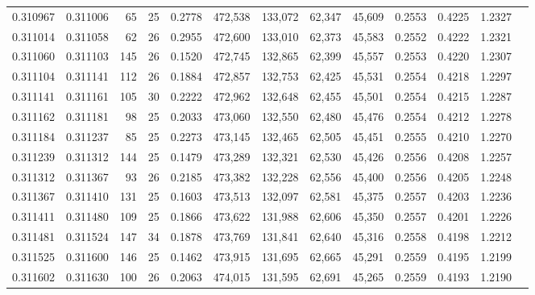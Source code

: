 \begin{tabular}{rrrrrrrrrrrrr}
0.310967 & 0.311006 &    65 &  25 &                                     0.2778 & 472,538 & 133,072 &  62,347 &  45,609 & 0.2553 & 0.4225 & 1.2327 \\
0.311014 & 0.311058 &    62 &  26 &                                     0.2955 & 472,600 & 133,010 &  62,373 &  45,583 & 0.2552 & 0.4222 & 1.2321 \\
0.311060 & 0.311103 &   145 &  26 &                                     0.1520 & 472,745 & 132,865 &  62,399 &  45,557 & 0.2553 & 0.4220 & 1.2307 \\
0.311104 & 0.311141 &   112 &  26 &                                     0.1884 & 472,857 & 132,753 &  62,425 &  45,531 & 0.2554 & 0.4218 & 1.2297 \\
0.311141 & 0.311161 &   105 &  30 &                                     0.2222 & 472,962 & 132,648 &  62,455 &  45,501 & 0.2554 & 0.4215 & 1.2287 \\
0.311162 & 0.311181 &    98 &  25 &                                     0.2033 & 473,060 & 132,550 &  62,480 &  45,476 & 0.2554 & 0.4212 & 1.2278 \\
0.311184 & 0.311237 &    85 &  25 &                                     0.2273 & 473,145 & 132,465 &  62,505 &  45,451 & 0.2555 & 0.4210 & 1.2270 \\
0.311239 & 0.311312 &   144 &  25 &                                     0.1479 & 473,289 & 132,321 &  62,530 &  45,426 & 0.2556 & 0.4208 & 1.2257 \\
0.311312 & 0.311367 &    93 &  26 &                                     0.2185 & 473,382 & 132,228 &  62,556 &  45,400 & 0.2556 & 0.4205 & 1.2248 \\
0.311367 & 0.311410 &   131 &  25 &                                     0.1603 & 473,513 & 132,097 &  62,581 &  45,375 & 0.2557 & 0.4203 & 1.2236 \\
0.311411 & 0.311480 &   109 &  25 &                                     0.1866 & 473,622 & 131,988 &  62,606 &  45,350 & 0.2557 & 0.4201 & 1.2226 \\
0.311481 & 0.311524 &   147 &  34 &                                     0.1878 & 473,769 & 131,841 &  62,640 &  45,316 & 0.2558 & 0.4198 & 1.2212 \\
0.311525 & 0.311600 &   146 &  25 &                                     0.1462 & 473,915 & 131,695 &  62,665 &  45,291 & 0.2559 & 0.4195 & 1.2199 \\
0.311602 & 0.311630 &   100 &  26 &                                     0.2063 & 474,015 & 131,595 &  62,691 &  45,265 & 0.2559 & 0.4193 & 1.2190 \\

\end{tabular}
